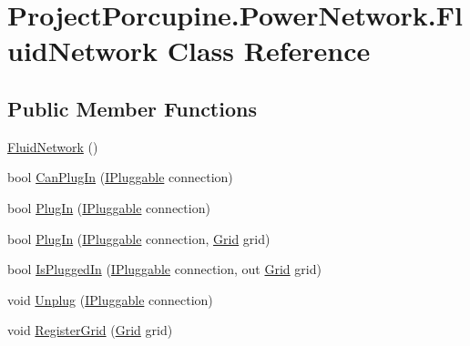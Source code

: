 \hypertarget{class_project_porcupine_1_1_power_network_1_1_fluid_network}{}\section{Project\+Porcupine.\+Power\+Network.\+Fluid\+Network Class Reference}
\label{class_project_porcupine_1_1_power_network_1_1_fluid_network}
\subsection*{Public Member Functions}
\begin{DoxyCompactItemize}
\item 
\hyperlink{class_project_porcupine_1_1_power_network_1_1_fluid_network_a56313c07f89f6cbe4d63e26582936065}{Fluid\+Network} ()
\item 
bool \hyperlink{class_project_porcupine_1_1_power_network_1_1_fluid_network_ab210e433e0a0b3f61c1c437c494eb4d2}{Can\+Plug\+In} (\hyperlink{interface_project_porcupine_1_1_power_network_1_1_i_pluggable}{I\+Pluggable} connection)
\item 
bool \hyperlink{class_project_porcupine_1_1_power_network_1_1_fluid_network_a596b3ddd907bf29d06b21a72921a3b88}{Plug\+In} (\hyperlink{interface_project_porcupine_1_1_power_network_1_1_i_pluggable}{I\+Pluggable} connection)
\item 
bool \hyperlink{class_project_porcupine_1_1_power_network_1_1_fluid_network_a9155ce52d47f07a8f55e4f62e7c82934}{Plug\+In} (\hyperlink{interface_project_porcupine_1_1_power_network_1_1_i_pluggable}{I\+Pluggable} connection, \hyperlink{class_project_porcupine_1_1_power_network_1_1_grid}{Grid} grid)
\item 
bool \hyperlink{class_project_porcupine_1_1_power_network_1_1_fluid_network_a1fe6971c5ba7c3c6a9a9cbc16cfa04b3}{Is\+Plugged\+In} (\hyperlink{interface_project_porcupine_1_1_power_network_1_1_i_pluggable}{I\+Pluggable} connection, out \hyperlink{class_project_porcupine_1_1_power_network_1_1_grid}{Grid} grid)
\item 
void \hyperlink{class_project_porcupine_1_1_power_network_1_1_fluid_network_a72e4f5480600b27bfab0a8ada1639899}{Unplug} (\hyperlink{interface_project_porcupine_1_1_power_network_1_1_i_pluggable}{I\+Pluggable} connection)
\item 
void \hyperlink{class_project_porcupine_1_1_power_network_1_1_fluid_network_a61faf6fab18cfdbd358862ba86d7203e}{Register\+Grid} (\hyperlink{class_project_porcupine_1_1_power_network_1_1_grid}{Grid} grid)

\end{DoxyCompactItemize}
